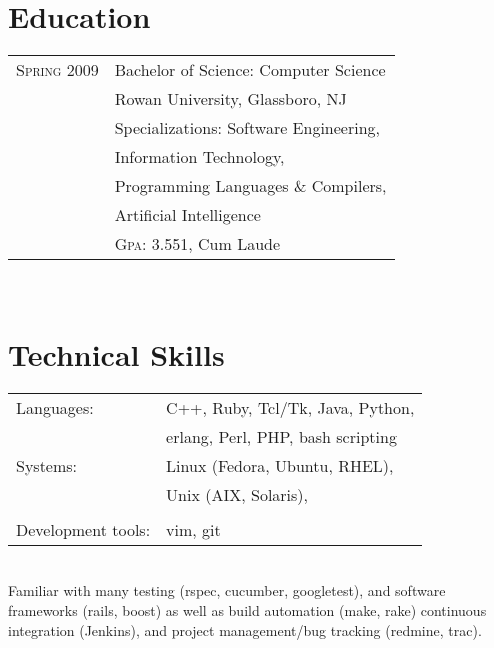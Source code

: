 \documentclass[10pt]{article}
\begin{document}
	\par{\centering
		{\sffamily\Huge {}
	}
	\par \hfill
	\par \hfill


\begin{minipage}[t]{0.44\textwidth} %
	
	\vspace{0pt} %
	

	

\section{Education}

\begin{tabular}{rl}
 	
	\textsc{Spring} 2009 & Bachelor of Science: Computer Science\\
	 & Rowan University, Glassboro, NJ\\
	 & Specializations: Software Engineering,\\
	 & Information Technology,\\
	 & Programming Languages \& Compilers,\\
	 & Artificial Intelligence\\
	 &\normalsize \textsc{Gpa}: 3.551, Cum Laude

\end{tabular}\\

\section{Technical Skills} 

    \begin{tabular}{ll}
		Languages:	       & C++, Ruby, Tcl/Tk, Java, Python,\\
		                   & erlang, Perl, PHP, bash scripting
		                   & \\
	    Systems:           & Linux (Fedora, Ubuntu, RHEL), \\
	                       & Unix (AIX, Solaris), \\
	                       & \\
	    Development tools: & vim, git
	                       & \\
	\end{tabular}\\
	  Familiar with many testing (rspec, cucumber, googletest),
	  and software frameworks (rails, boost) as well as build
	  automation (make, rake) continuous integration (Jenkins),
	  and project management/bug tracking (redmine, trac).\\


\end{minipage}}
\end{document}
